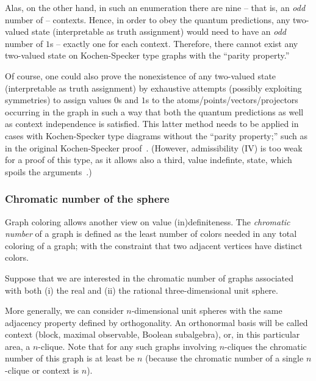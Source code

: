\documentclass[%
  twocolumn,
 showpacs,
 showkeys,
 preprintnumbers,
 amsmath,amssymb,
 aps,
  pra,
  longbibliography,
 floatfix,
 ]{revtex4-1}
\begin{document}
Alas, on the other hand, in such an enumeration
there are nine  -- that is, an {\em odd} number of -- contexts.
Hence,
in order to obey the quantum predictions,
any  two-valued state (interpretable as truth assignment)
would need to have an {\em odd} number of $1$s -- exactly one for each context.
Therefore, there cannot exist any two-valued state on Kochen-Specker type graphs with the  ``parity property.''

Of course, one could also prove the nonexistence of any  two-valued state (interpretable as truth assignment)
by exhaustive attempts
(possibly exploiting symmetries) to assign values $0$s and $1$s to the atoms/points/vectors/projectors occurring in the graph
in such a way that both the quantum predictions as well as context independence is satisfied.
This latter method needs to be applied in cases with Kochen-Specker type diagrams without the  ``parity property;''
such as in the original Kochen-Specker proof~\cite{kochen1}.
(However, admissibility (IV) is too weak for a proof of this type,
as it allows also a third, value indefinte, state, which spoils the arguments~\cite{2015-AnalyticKS}.)

\subsubsection{Chromatic number of the sphere}

Graph coloring allows another view on value (in)definiteness.
The {\em chromatic number} of a graph
is defined as the least number of colors needed in any total coloring of a graph;
with the constraint that two adjacent vertices have distinct colors.

Suppose that we are interested in the chromatic number of graphs associated with
both (i) the real and (ii) the rational three-dimensional unit sphere.

More generally, we can consider $n$-dimensional unit spheres with the same adjacency property defined by orthogonality.
An orthonormal basis will be called context (block, maximal observable, Boolean subalgebra),
or, in this particular area, a $n$-clique.
Note that for any such graphs involving $n$-cliques the chromatic number of this graph is at least be $n$
(because the chromatic number of a single $n$-clique or context is $n$).
\end{document}
